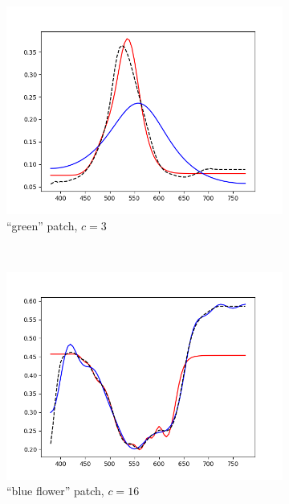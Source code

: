 \begin{figure}[t]
\begin{subfigure}[t]{0.45\textwidth}
		\includegraphics[width=\linewidth]{img/results_techniqueGreen.png}
		\caption{``green'' patch, $c = 3$}
		\label{fig:resultsWarping_green}
	\end{subfigure} \hspace{0.1em}
	\vspace{0.5em}\\
	\begin{subfigure}[t]{0.45\textwidth}
		\includegraphics[width=\linewidth]{img/results_techniqueBlueFlower.png}
		\caption{``blue flower'' patch, $c = 16$}
		\label{fig:resultsWarping_blueFlower}
	\end{subfigure} \hspace{0.1em}
	\begin{subfigure}[t]{0.45\textwidth}

\end{subfigure}
\end{figure}

